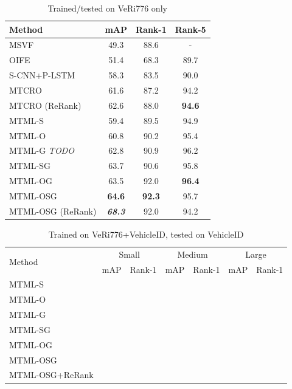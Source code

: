 \documentclass[10pt,twocolumn,letterpaper]{article}
\begin{document}
\begin{table}
  \centering
  \begin{tabular}{l || c | c | c }
    \hline
    Method & mAP & Rank-1 & Rank-5 \\
    \hline
    MSVF \cite{kanaci2018vehicle} & 49.3 & 88.6 & - \\
    OIFE \cite{wang2017orientation} & 51.4 & 68.3 & 89.7 \\
    S-CNN+P-LSTM \cite{Shen_2017_ICCV} & 58.3 & 83.5 & 90.0 \\
    MTCRO \cite{xu2018framework} & 61.6 & 87.2 & 94.2 \\
    MTCRO (ReRank) \cite{xu2018framework} & 62.6 & 88.0 & \bf{94.6} \\
    \hline
    MTML-S & 59.4 & 89.5 & 94.9 \\
    MTML-O & 60.8 & 90.2 & 95.4 \\
    MTML-G \emph{TODO} & 62.8 & 90.9 & 96.2 \\
    \hdashline
    MTML-SG & 63.7 & 90.6 & 95.8 \\
    MTML-OG & 63.5 & 92.0 & \bf{96.4}\\
    MTML-OSG & \bf{64.6} & \bf{92.3} & 95.7 \\
    \hdashline
    MTML-OSG (ReRank) & \bf{\emph{68.3}} & 92.0 & 94.2 \\
    \hline
  \end{tabular}
  \caption{Trained/tested on VeRi776 only}
  \label{T:benchmark_results_veri}
\end{table}

\begin{table}
  \centering
  \begin{tabular}{l || c | c || c | c || c | c }
    \hline
    \multirow{2}{*}{Method} & \multicolumn{2}{c}{Small} & \multicolumn{2}{c}{Medium} &\multicolumn{2}{c}{Large} \\
    \cline{2-7}
    & mAP & Rank-1 & mAP & Rank-1 & mAP & Rank-1 \\
    \hline
    MTML-S & \\
    MTML-O & \\
    MTML-G & \\
    MTML-SG & \\
    MTML-OG & \\
    MTML-OSG & \\
    MTML-OSG+ReRank & \\
    \hline
  \end{tabular}
  \caption{Trained on VeRi776+VehicleID, tested on VehicleID}
  \label{T:benchmark_results_vehicleid}
\end{table}
\end{document}
